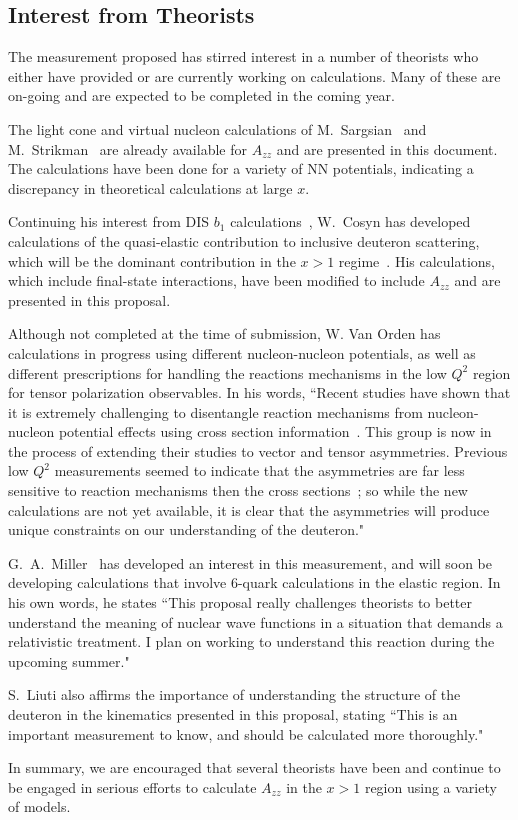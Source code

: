 \subsection{Interest from Theorists}

The measurement proposed has stirred interest in a number of theorists who either have provided or are currently working on calculations. Many of these are on-going and are expected to be completed in the coming year.

The light cone and virtual nucleon calculations of M.~Sargsian~\cite{misak-convo} and M.~Strikman~\cite{strikman-convo} are already available for $A_{zz}$ and are presented in this document. The calculations have been done for a variety of NN potentials, indicating a discrepancy in theoretical calculations at large $x$. 

Continuing his interest from DIS $b_1$ calculations~\cite{Cosyn:2014sqa}, W.~Cosyn has developed calculations of the quasi-elastic contribution to inclusive deuteron scattering, which will be the dominant contribution in the $x>1$ regime~\cite{cosyn-convo}. His calculations, which include final-state interactions, have been modified to include $A_{zz}$ and are presented in this proposal.

Although not completed at the time of submission, W. Van Orden has calculations in progress using different nucleon-nucleon potentials, as well as different prescriptions for handling the reactions mechanisms in the low $Q^2$ region for tensor polarization observables. In his words, ``Recent studies have shown that it is extremely challenging to disentangle reaction mechanisms from nucleon-nucleon potential effects using cross section information~\cite{Ford:2014yua}. This group is now in the process of extending their studies to vector and tensor asymmetries. Previous low $Q^2$ measurements seemed to indicate that the asymmetries are far less sensitive to reaction 
mechanisms then the cross sections~\cite{Passchier:2001uc}; so while the 
new calculations are not yet available, it is clear that the asymmetries will produce unique constraints 
on our understanding of the deuteron."~\cite{vanorden-convo}

G.~A.~Miller~\cite{miller-convo} has developed an interest in this measurement, and will soon be developing calculations that involve 6-quark calculations in the elastic region. In his own words, he states ``This proposal really challenges theorists to better understand the meaning of nuclear wave functions in a situation that demands a relativistic treatment. I plan on working to understand this reaction during the upcoming summer."

S.~Liuti also affirms the importance of understanding the structure of the deuteron in the kinematics presented in this proposal, stating ``This is an important measurement to know, and should be calculated more thoroughly."~\cite{liuti-convo}



In summary, we are encouraged that several theorists have been and continue to be engaged in serious efforts to calculate $A_{zz}$ in the $x>1$ region using a variety of models.